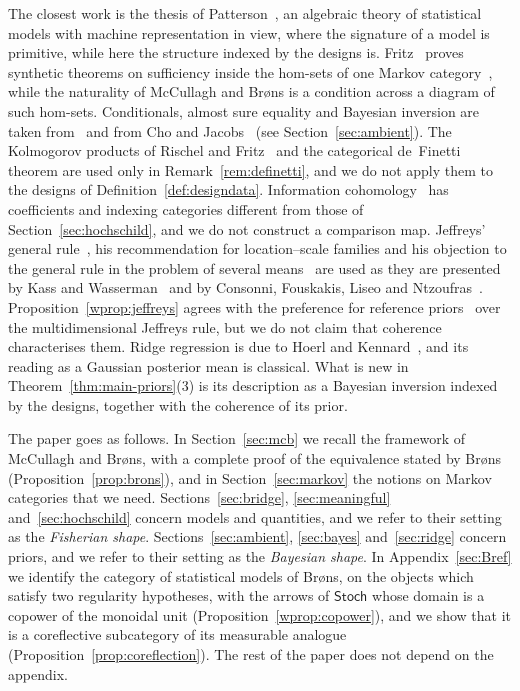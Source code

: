 \documentclass[11pt,a4paper]{article}
\theoremstyle{plain}
\theoremstyle{definition}
\theoremstyle{remark}
\newcommand{\cat}[1]{\mathsf{#1}}
\newcommand{\Stoch}{\cat{Stoch}}
\begin{document}
The closest work is the thesis of Patterson~\cite{patterson_algebra_2020}, an
algebraic theory of statistical models with machine representation in view,
where the signature of a model is primitive, while here the structure indexed
by the designs is. Fritz~\cite{fritz_synthetic_2020} proves synthetic theorems
on sufficiency inside the hom-sets of one Markov
category~\cite[Def.~14.1]{fritz_synthetic_2020}, while the naturality of
McCullagh and Br\o ns is a condition across a diagram of such hom-sets.
Conditionals, almost sure equality and Bayesian inversion are taken
from~\cite{fritz_synthetic_2020} and from Cho and
Jacobs~\cite{cho_disintegration_2019} (see Section~\ref{sec:ambient}). The
Kolmogorov products of Rischel and Fritz~\cite{fritz_rischel_infinite_2020}
and the categorical de~Finetti theorem are used only in
Remark~\ref{rem:definetti}, and we do not apply them to the designs of
Definition~\ref{def:designdata}. Information
cohomology~\cite{baudot_homological_2015,vigneaux_information_2021} has
coefficients and indexing categories different from those of
Section~\ref{sec:hochschild}, and we do not construct a comparison map.
Jeffreys' general rule~\cite{jeffreys_invariant_1946}, his recommendation for
location--scale families and his objection to the general rule in the problem
of several means~\cite{jeffreys_theory_1961} are used as they are presented by
Kass and Wasserman~\cite{kass_selection_1996} and by Consonni, Fouskakis, Liseo
and Ntzoufras~\cite{consonni_prior_2018}. Proposition~\ref{wprop:jeffreys}
agrees with the preference for reference
priors~\cite{bernardo_reference_1979,berger_formal_2009} over the
multidimensional Jeffreys rule, but we do not claim that coherence
characterises them. Ridge regression is due to Hoerl and
Kennard~\cite{hoerl_ridge_1970}, and its reading as a Gaussian posterior mean
is classical. What is new in Theorem~\ref{thm:main-priors}(3) is its
description as a Bayesian inversion indexed by the designs, together with the
coherence of its prior.

The paper goes as follows. In Section~\ref{sec:mcb} we recall the framework of
McCullagh and Br\o ns, with a complete proof of the equivalence stated by
Br\o ns (Proposition~\ref{prop:brons}), and in Section~\ref{sec:markov} the
notions on Markov categories that we need.
Sections~\ref{sec:bridge}, \ref{sec:meaningful} and~\ref{sec:hochschild}
concern models and quantities, and we refer to their setting as the
\emph{Fisherian shape}. Sections~\ref{sec:ambient}, \ref{sec:bayes}
and~\ref{sec:ridge} concern priors, and we refer to their setting as the
\emph{Bayesian shape}. In Appendix~\ref{sec:Bref} we identify the category of
statistical models of Br\o ns, on the objects which satisfy two regularity
hypotheses, with the arrows of $\Stoch$ whose domain is a copower of the
monoidal unit (Proposition~\ref{wprop:copower}), and we show that it is a
coreflective subcategory of its measurable analogue
(Proposition~\ref{prop:coreflection}). The rest of the paper does not depend
on the appendix.
\end{document}
